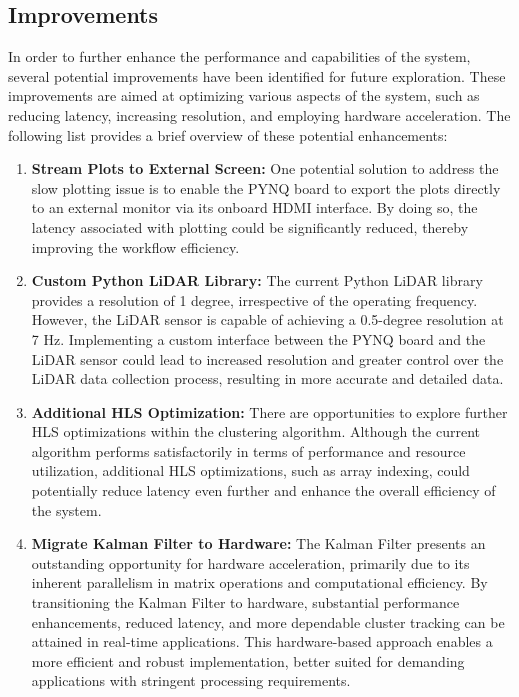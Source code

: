\documentclass[journal]{IEEEtran} %
\begin{document}
\subsection{Improvements}

In order to further enhance the performance and capabilities of the system, several potential improvements have been identified for future exploration. These improvements are aimed at optimizing various aspects of the system, such as reducing latency, increasing resolution, and employing hardware acceleration. The following list provides a brief overview of these potential enhancements:

\begin{enumerate}
\item \textbf{Stream Plots to External Screen:}
One potential solution to address the slow plotting issue is to enable the PYNQ board to export the plots directly to an external monitor via its onboard HDMI interface. By doing so, the latency associated with plotting could be significantly reduced, thereby improving the workflow efficiency.

\item \textbf{Custom Python LiDAR Library:}
The current Python LiDAR library provides a resolution of 1 degree, irrespective of the operating frequency. However, the LiDAR sensor is capable of achieving a 0.5-degree resolution at 7 Hz. Implementing a custom interface between the PYNQ board and the LiDAR sensor could lead to increased resolution and greater control over the LiDAR data collection process, resulting in more accurate and detailed data.

\item \textbf{Additional HLS Optimization:}
There are opportunities to explore further HLS optimizations within the clustering algorithm. Although the current algorithm performs satisfactorily in terms of performance and resource utilization, additional HLS optimizations, such as array indexing, could potentially reduce latency even further and enhance the overall efficiency of the system.

\item \textbf{Migrate Kalman Filter to Hardware:}
The Kalman Filter presents an outstanding opportunity for hardware acceleration, primarily due to its inherent parallelism in matrix operations and computational efficiency. By transitioning the Kalman Filter to hardware, substantial performance enhancements, reduced latency, and more dependable cluster tracking can be attained in real-time applications. This hardware-based approach enables a more efficient and robust implementation, better suited for demanding applications with stringent processing requirements.

\end{enumerate}
\end{document}
